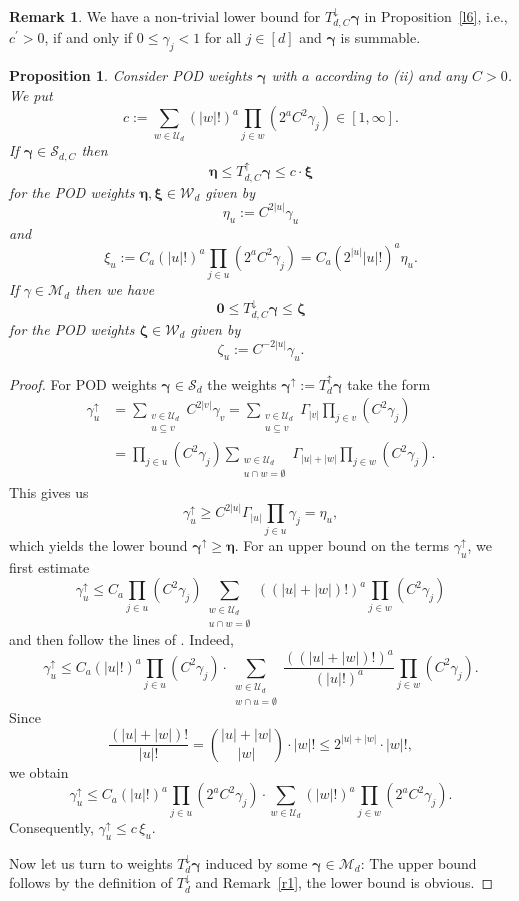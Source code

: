 \documentclass{article}
\newcommand{\bg}{{\boldsymbol{\gamma}}}
\newcommand{\be}{{\boldsymbol{\eta}}}
\newcommand{\bxi}{{\boldsymbol{\xi}}}
\newcommand{\bz}{{\boldsymbol{\zeta}}}
\newcommand{\bn}{{\boldsymbol{0}}}
\newcommand{\U}  {\mathcal{U}}
\newcommand{\W}  {\mathcal{W}}
\newcommand{\M}  {\mathcal{M}}
\newcommand{\SSS}{\mathcal{S}}
\newcommand{\lo}{\downarrow}
\newcommand{\up}{\uparrow}
\theoremstyle{plain}
\newtheorem{prop}{Proposition}
\theoremstyle{definition}
\newtheorem{rem}{Remark}
\begin{document}
\begin{rem}\label{Rem5}
We have a non-trivial lower bound for $T_{d,C}^\lo \bg$ in
Proposition~\ref{l6}, i.e., $c^\prime > 0$, if and only if
$0 \leq \gamma_j < 1$ for all $j \in [d]$ and $\bg$ is summable.
\end{rem}


\begin{prop}\label{l7}
Consider POD weights $\bg$ with $a$
according to (ii) and any $C>0$. We put
\[
c := 
\sum_{w \in \U_d} (|w|!)^a \prod_{j\in w} (2^a C^2 \gamma_j) \in
[1,\infty].
\]
If $\bg \in \SSS_{d,C}$ then
\[
\be \leq T^\up_{d,C} \bg \leq c \cdot \bxi
\]
for the POD weights $\be,\bxi \in \W_d$
given by 
\[
\eta_u := C^{2|u|} \gamma_u
\]
and
\[
\xi_u := 
C_a \left( |u|! \right)^a \prod_{j\in u} 
\left( 2^a C^2 \gamma_j \right)
= C_a \left( 2^{|u|} |u|! \right)^a \eta_u. 
\]
If $\gamma \in \M_d$ then we have
\[
\bn \leq T^\lo_{d,C} \bg \le \bz 
\]
for the POD weights $\bz \in \W_d$ given by
\[
\zeta_u := C^{-2|u|} 
\gamma_u.
\]
\end{prop}



\begin{proof}
For POD weights $\bg \in \SSS_d$
the weights $\bg^{\up} := T^\up_d \bg$ take the form
\begin{align*}
\gamma_u^{\up} &= 
\sum_{\substack{v \in \U_d\\ u \subseteq v}} C^{2|v|} \gamma_v 
= \sum_{\substack{v \in \U_d\\ u \subseteq v}}
\Gamma_{|v|} \prod_{j\in v}
\left(C^2\gamma_j\right)\\
&= \prod_{j\in u} \left(C^2\gamma_j\right) 
\sum_{\substack{w \in \U_d\\ u \cap w = \emptyset}}
\Gamma_{|u|+|w|} \prod_{j\in w}
\left(C^2\gamma_j\right).
\end{align*}
This gives us 
\[
\gamma_u^{\up} \ge C^{2|u|} \Gamma_{|u|} \prod_{j\in u} \gamma_j 
=
\eta_u,
\]
which yields the lower bound $\bg^\up \ge \be$.
For an upper bound on the terms $\gamma_u^{\up}$,
we first estimate
\[
\gamma_u^{\up}  \le C_a  \prod_{j\in u} \left(C^2\gamma_j\right) 
\sum_{\substack{w \in \U_d\\ u \cap w = \emptyset}}
\left((|u|+|w|)!\right)^a \prod_{j\in w}
\left(C^2\gamma_j\right)
\]
and then follow the lines of \citet[pp.~208--209]{DKS13}. Indeed,
\[
\gamma_u^{\up} 
\le C_a (|u|!)^a \prod_{j\in u} \left(C^2\gamma_j\right) 
\cdot \sum_{\substack{w \in \U_d\\ w \cap u = \emptyset}}
\frac{\left((|u|+|w|)!\right)^a}{\left(|u|!\right)^a}
\prod_{j\in w} \left(C^2\gamma_j\right).
\]
Since
\[
\frac{(|u|+|w|)!}{|u|!} = 
\binom{|u|+|w|}{|w|} \cdot |w|! \leq 
2^{|u|+|w|} \cdot |w|!,
\]
we obtain
\[
\gamma_u^{\up} 
\leq 
C_a (|u|!)^a \prod_{j\in u} \left(2^a C^2\gamma_j\right)
\cdot
\sum_{w \in \U_d} \left(|w|!\right)^a
\prod_{j\in w} \left(2^a C^2 \gamma_j\right).
\]
Consequently, $\gamma_u^{\up} \le c \,\xi_u$.

Now let us turn to weights $T^\lo_d \bg$ induced by some 
$\bg \in \M_d$: The upper bound follows by the definition of 
$T_d^\lo$ and Remark~\ref{r1}, the lower bound is obvious. 
\end{proof}
\end{document}

